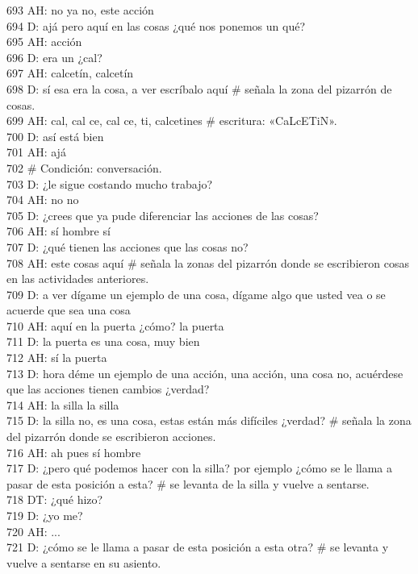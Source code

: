 693 AH: no ya no, este acción\\
694 D: ajá pero aquí en las cosas ¿qué nos ponemos un qué?\\
695 AH: acción\\
696 D: era un ¿cal?\\
697 AH: calcetín, calcetín\\
698 D: sí esa era la cosa, a ver escríbalo aquí \# señala la zona del pizarrón de cosas.\\
699 AH: cal, cal ce, cal ce, ti, calcetines \# escritura: «CaLcETiN».\\
700 D: así está bien\\
701 AH: ajá\\
702 \# Condición: conversación.\\
703 D: ¿le sigue costando mucho trabajo?\\
704 AH: no no\\
705 D: ¿crees que ya pude diferenciar las acciones de las cosas?\\
706 AH: sí hombre sí\\
707 D: ¿qué tienen las acciones que las cosas no?\\
708 AH: este cosas aquí \# señala la zonas del pizarrón donde se escribieron cosas en las actividades anteriores.\\
709 D: a ver dígame un ejemplo de una cosa, dígame algo que usted vea o se acuerde que sea una cosa\\
710 AH: aquí en la puerta ¿cómo? la puerta\\
711 D: la puerta es una cosa, muy bien\\
712 AH: sí la puerta\\
713 D: hora déme un ejemplo de una acción, una acción, una cosa no, acuérdese que las acciones tienen cambios ¿verdad?\\
714 AH: la silla la silla\\
715 D: la silla no, es una cosa, estas están más difíciles ¿verdad? \# señala la zona del pizarrón donde se escribieron acciones.\\
716 AH: ah pues sí hombre\\
717 D: ¿pero qué podemos hacer con la silla? por ejemplo ¿cómo se le llama a pasar de esta posición a esta? \# se levanta de la silla y vuelve a sentarse.\\
718 DT: ¿qué hizo?\\
719 D: ¿yo me?\\
720 AH: ...\\
721 D: ¿cómo se le llama a pasar de esta posición a esta otra? \# se levanta y vuelve a sentarse en su asiento.\\

